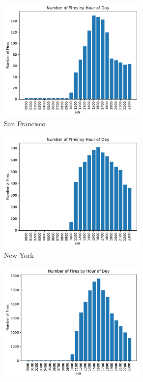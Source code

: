 \documentclass[10pt]{article}
\begin{document}
\begin{figure}[H]
    \centering
    \begin{subfigure}[t]{0.3\textwidth}
        \centering
        \includegraphics[width=0.8\textwidth]{../plot/byhour_sf.pdf}
        \caption{San Francisco}
    \end{subfigure}
    \begin{subfigure}[t]{0.3\textwidth}
        \centering
        \includegraphics[width=0.8\textwidth]{../plot/byhour_ny.pdf}
        \caption{New York}
    \end{subfigure}
    \begin{subfigure}[t]{0.3\textwidth}
        \centering
        \includegraphics[width=0.8\textwidth]{../plot/byhour_all.pdf}

\end{subfigure}
\end{figure}
\end{document}

